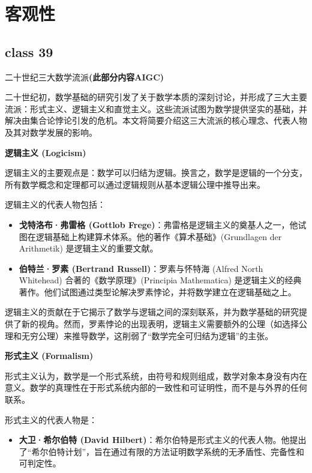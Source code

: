 \documentclass[12pt, a4paper, oneside, UTF8]{ctexbook}  %
\begin{document}
\else
\fi
\chapter{客观性}
\section{class 39}
\begin{add}
二十世纪三大数学流派\textbf{(此部分内容AIGC)}

二十世纪初，数学基础的研究引发了关于数学本质的深刻讨论，并形成了三大主要流派：形式主义、逻辑主义和直觉主义。这些流派试图为数学提供坚实的基础，并解决由集合论悖论引发的危机。本文将简要介绍这三大流派的核心理念、代表人物及其对数学发展的影响。

\textbf{逻辑主义 (Logicism)}

逻辑主义的主要观点是：数学可以归结为逻辑。换言之，数学是逻辑的一个分支，所有数学概念和定理都可以通过逻辑规则从基本逻辑公理中推导出来。

逻辑主义的代表人物包括：
\begin{itemize}
    \item \textbf{戈特洛布·弗雷格 (Gottlob Frege)}：弗雷格是逻辑主义的奠基人之一，他试图在逻辑基础上构建算术体系。他的著作《算术基础》(Grundlagen der Arithmetik) 是逻辑主义的重要文献。
    \item \textbf{伯特兰·罗素 (Bertrand Russell)}：罗素与怀特海 (Alfred North Whitehead) 合著的《数学原理》(Principia Mathematica) 是逻辑主义的经典著作。他们试图通过类型论解决罗素悖论，并将数学建立在逻辑基础之上。
\end{itemize}

逻辑主义的贡献在于它揭示了数学与逻辑之间的深刻联系，并为数学基础的研究提供了新的视角。然而，罗素悖论的出现表明，逻辑主义需要额外的公理（如选择公理和无穷公理）来推导数学，这削弱了“数学完全可归结为逻辑”的主张。

\textbf{形式主义 (Formalism)}

形式主义认为，数学是一个形式系统，由符号和规则组成，数学对象本身没有内在意义。数学的真理性在于形式系统内部的一致性和可证明性，而不是与外界的任何联系。

形式主义的代表人物是：
\begin{itemize}
    \item \textbf{大卫·希尔伯特 (David Hilbert)}：希尔伯特是形式主义的代表人物。他提出了“希尔伯特计划”，旨在通过有限的方法证明数学系统的无矛盾性、完备性和可判定性。
\end{itemize}


\end{add}
\end{document}
